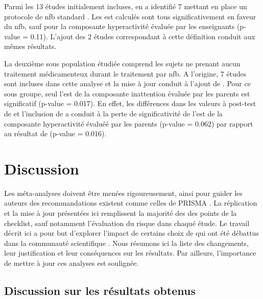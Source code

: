 Parmi les 13 études initialement incluses, \citet{Cortese2016} en a identifié 7 mettant en place un protocole de \gls{nfb} standard \citep{Bakhshayesh2011,
Christiansen2014, Gevensleben2009, Beauregard2006, Holtmann2009, Heinrich2004, Linden1996}. 
Les \gls{est} calculés sont tous significativement en faveur du \gls{nfb}, sauf pour la composante hyperactivité évaluée par les enseignants (p-value = 0.11). 
L'ajout des 2 études correspondant à cette définition \citep{Strehl2017, Baumeister2016} conduit aux mêmes résultats. 

La deuxième sous population étudiée comprend les sujets ne prenant aucun traitement médicamenteux durant le traitement par \gls{nfb}. A l'origine, 7 études
sont incluses dans cette analyse \citep{Beauregard2006, Gevensleben2009, Bakhshayesh2011, Arnold2014, Linden1996, Christiansen2014, Maurizio2014} et la 
mise à jour conduit à l'ajout de \citep{Bazanova2018}. Pour ce sous groupe, seul l'\gls{est} de la composante inattention évaluée par les parents est significatif
(p-value = 0.017). En effet, les différences dans les valeurs à post-test de \citet{Arnold2014} et l'inclusion de \citet{Bazanova2018} a conduit à la perte de 
significativité de l'\gls{est} de la composante hyperactivité évaluéé par les parents (p-value = 0.062) par rapport au résultat de \citet{Cortese2016} (p-value 
= 0.016).

\section{Discussion} 

Les méta-analyses doivent être menées rigoureusement, ainsi pour guider les auteurs des recommandations existent comme celles de PRISMA \citep{Moher2009}.
La réplication et la mise à jour présentées ici remplissent la majorité des des points de la checklist, sauf notamment l'évaluation du risque dans chaqué étude. 
Le travail décrit ici a pour but d'explorer l'impact de certains choix de \citet{Cortese2016} qui ont été débattus dans la communauté scientifique 
\citep{Micoulaud2016}. Nous résumons ici la liste des changements, leur justification et leur conséquences sur les résultats. Par ailleurs, l'importance de mettre 
à jour ces analyses est soulignée.

\subsection{Discussion sur les résultats obtenus} \label{replication_and_update}

